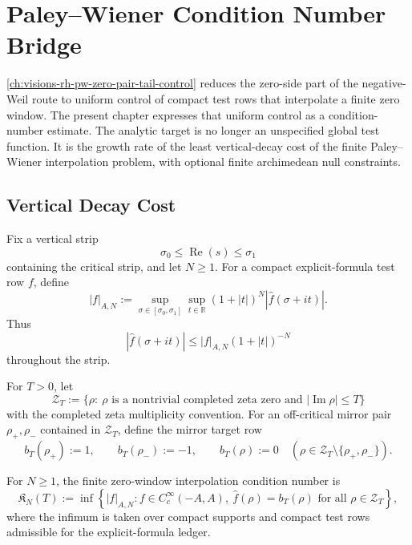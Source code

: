 \chapter{Paley--Wiener Condition Number Bridge}
\label{ch:visions-rh-pw-condition-number-bridge}

\autoref{ch:visions-rh-pw-zero-pair-tail-control} reduces the
zero-side part of the negative-Weil route to uniform control of compact
test rows that interpolate a finite zero window.  The present chapter
expresses that uniform control as a condition-number estimate.  The
analytic target is no longer an unspecified global test function.  It
is the growth rate of the least vertical-decay cost of the finite
Paley--Wiener interpolation problem, with optional finite archimedean
null constraints.

\section{Vertical Decay Cost}
\label{sec:rh-pw-condition-number-vertical-decay-cost}

\begin{definition}
\label{def:rh-vertical-pw-seminorm}
Fix a vertical strip
$$
\sigma_0\le \operatorname{Re}(s)\le\sigma_1
$$
containing the critical strip, and let $N\ge1$.  For a compact
explicit-formula test row $f$, define
$$
|f|_{A,N}
:=
\sup_{\sigma\in[\sigma_0,\sigma_1]}
\sup_{t\in\mathbb R}
(1+|t|)^N|\widehat f(\sigma+it)|.
$$
Thus
$$
|\widehat f(\sigma+it)|
\le
|f|_{A,N}(1+|t|)^{-N}
$$
throughout the strip.
\end{definition}

\begin{definition}
\label{def:rh-symmetric-height-zero-window}
For $T>0$, let
$$
\mathcal Z_T
:=
\{\rho:\ \rho\text{ is a nontrivial completed zeta zero and }
|\operatorname{Im}\rho|\le T\}
$$
with the completed zeta multiplicity convention.  For an off-critical
mirror pair $\rho_+,\rho_-$ contained in $\mathcal Z_T$, define the
mirror target row
$$
b_T(\rho_+):=1,
\qquad
b_T(\rho_-):=-1,
\qquad
b_T(\rho):=0
\quad
(\rho\in\mathcal Z_T\setminus\{\rho_+,\rho_-\}).
$$
\end{definition}

\begin{definition}
\label{def:rh-pw-interpolation-condition-number}
For $N\ge1$, the finite zero-window interpolation condition number is
$$
\mathfrak K_N(T)
:=
\inf
\left\{
|f|_{A,N}:
f\in C_c^\infty(-A,A),\
\widehat f(\rho)=b_T(\rho)\text{ for all }\rho\in\mathcal Z_T
\right\},
$$
where the infimum is taken over compact supports and compact test rows
admissible for the explicit-formula ledger.
\end{definition}

